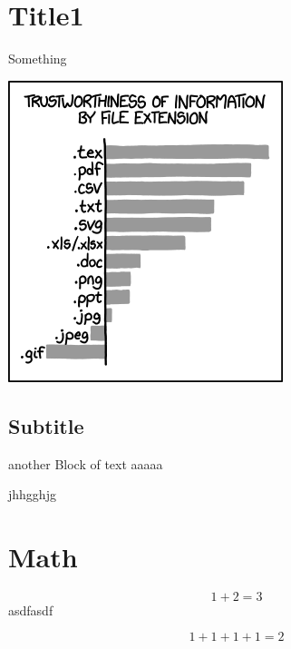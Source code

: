 
\section{Title1}
Something

\includegraphics{image.png}
\subsection{Subtitle}
another Block of text
aaaaa

jhhgghjg

\section{Math}
$$1+2 = 3$$
asdfasdf

\[1+1+1+1=2\]
